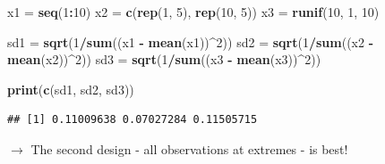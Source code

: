 \documentclass[10pt,ignorenonframetext,]{beamer}
\newenvironment{Shaded}{\begin{snugshade}}{\end{snugshade}}
\newcommand{\KeywordTok}[1]{\textcolor[rgb]{0.13,0.29,0.53}{\textbf{#1}}}
\newcommand{\DecValTok}[1]{\textcolor[rgb]{0.00,0.00,0.81}{#1}}
\newcommand{\StringTok}[1]{\textcolor[rgb]{0.31,0.60,0.02}{#1}}
\newcommand{\OperatorTok}[1]{\textcolor[rgb]{0.81,0.36,0.00}{\textbf{#1}}}
\newcommand{\NormalTok}[1]{#1}
\begin{document}
\begin{frame}[fragile]

\small

\begin{Shaded}
\begin{Highlighting}[]
\NormalTok{x1 =}\StringTok{ }\KeywordTok{seq}\NormalTok{(}\DecValTok{1}\OperatorTok{:}\DecValTok{10}\NormalTok{)}
\NormalTok{x2 =}\StringTok{ }\KeywordTok{c}\NormalTok{(}\KeywordTok{rep}\NormalTok{(}\DecValTok{1}\NormalTok{, }\DecValTok{5}\NormalTok{), }\KeywordTok{rep}\NormalTok{(}\DecValTok{10}\NormalTok{, }\DecValTok{5}\NormalTok{))}
\NormalTok{x3 =}\StringTok{ }\KeywordTok{runif}\NormalTok{(}\DecValTok{10}\NormalTok{, }\DecValTok{1}\NormalTok{, }\DecValTok{10}\NormalTok{)}

\NormalTok{sd1 =}\StringTok{ }\KeywordTok{sqrt}\NormalTok{(}\DecValTok{1}\OperatorTok{/}\KeywordTok{sum}\NormalTok{((x1 }\OperatorTok{-}\StringTok{ }\KeywordTok{mean}\NormalTok{(x1))}\OperatorTok{^}\DecValTok{2}\NormalTok{))}
\NormalTok{sd2 =}\StringTok{ }\KeywordTok{sqrt}\NormalTok{(}\DecValTok{1}\OperatorTok{/}\KeywordTok{sum}\NormalTok{((x2 }\OperatorTok{-}\StringTok{ }\KeywordTok{mean}\NormalTok{(x2))}\OperatorTok{^}\DecValTok{2}\NormalTok{))}
\NormalTok{sd3 =}\StringTok{ }\KeywordTok{sqrt}\NormalTok{(}\DecValTok{1}\OperatorTok{/}\KeywordTok{sum}\NormalTok{((x3 }\OperatorTok{-}\StringTok{ }\KeywordTok{mean}\NormalTok{(x3))}\OperatorTok{^}\DecValTok{2}\NormalTok{))}

\KeywordTok{print}\NormalTok{(}\KeywordTok{c}\NormalTok{(sd1, sd2, sd3))}
\end{Highlighting}
\end{Shaded}

\begin{verbatim}
## [1] 0.11009638 0.07027284 0.11505715
\end{verbatim}

\(\rightarrow\) The second design - all observations at extremes - is
best!

\end{frame}
\end{document}
